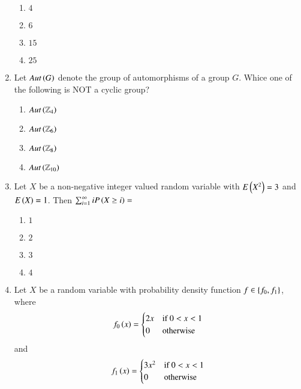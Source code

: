 \documentclass[journal,onecolumn]{IEEEtran}
\theoremstyle{remark}
\begin{document}
\begin{enumerate}
	\begin{enumerate}
		\item $4$ 
		\item $6$
		\item $15$
		\item $25$
	\end{enumerate}


    \item Let $Aut\left(G\right)$ denote the group of automorphisms of a group $G$. Whice one of the following is NOT a cyclic group?
	\hfill{}

	\begin{enumerate}
		\item $Aut\left(\mathbb{Z}_4\right)$
		\item $Aut\left(\mathbb{Z}_6\right)$
		\item $Aut\left(\mathbb{Z}_8\right)$
		\item $Aut\left(\mathbb{Z}_{10}\right)$
	\end{enumerate}

    \item Let $X$ be a non-negative integer valued random variable with $E\left(X^2\right) = 3$ and $E\left(X\right) = 1$. Then $\sum_{i = 1}^{\infty} iP\left(X \geq i\right) = $
	\hfill{}

	\begin{enumerate}
		\item $1$
		\item $2$
		\item $3$
		\item $4$
	\end{enumerate}

    \item Let $X$ be a random variable with probability density function $f \in \left\{f_0, f_1\right\}$, where
	\begin{align*}
		f_0\left(x\right) = 
		\begin{cases}
			2x & \text{if } 0 < x < 1\\
			0 & \text{otherwise}\\
		\end{cases}
	\end{align*}
	and
	\begin{align*}
		f_1\left(x\right) = 
		\begin{cases}
			3x^2 & \text{if } 0 < x < 1\\
			0 & \text{otherwise}\\
		\end{cases}
	\end{align*}


\end{enumerate}
\end{document}
